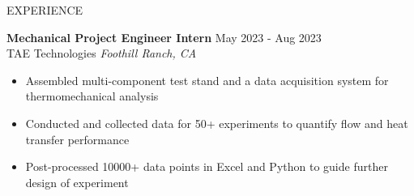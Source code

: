 \documentclass{resume} %
\begin{document}
\begin{rSection}{EXPERIENCE}
 
\textbf{Mechanical Project Engineer Intern} \hfill May 2023 - Aug 2023\\
TAE Technologies \hfill \textit{Foothill Ranch, CA}
 \begin{itemize}
    \itemsep -6pt {} 
    \item Assembled multi-component test stand and a data acquisition system for thermomechanical analysis
     \item Conducted and collected data for 50+ experiments to quantify flow and heat transfer performance 
     \item Post-processed 10000+ data points in Excel and Python to guide further design of experiment 
 \end{itemize}

 


\end{rSection}
\end{document}
